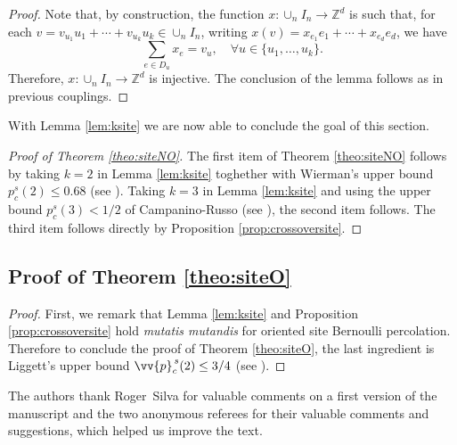 \documentclass{aptpub}
\newcommand{\Z}{\mathbb{Z}}
\begin{document}
\begin{proof}
Note  that, by construction, the function $x: \cup_n I_n \longrightarrow \Z^d$ is such that, for each $v = v_{u_1}u_1+ \cdots + v_{u_k}u_k \in \cup_n I_n$, writing $x(v) = x_{e_1} e_1 + \cdots + x_{e_d} e_d$, we have
\begin{equation*}
    \sum_{e \in D_u} x_e = v_u, \quad \forall u \in \{u_1, \dots, u_k\}.
\end{equation*}
Therefore, $x: \cup_n I_n \longrightarrow \Z^d$ is injective. The conclusion of the lemma follows as in previous couplings. %
\end{proof}

With Lemma \ref{lem:ksite} we are now able to conclude the goal of this section.

\begin{proof}[Proof of Theorem \ref{theo:siteNO}]
The first item of Theorem \ref{theo:siteNO} follows by taking $k=2$ in Lemma \ref{lem:ksite} toghether with Wierman's upper bound $p_c^s(2)\leq 0.68$ (see \cite{W2}). Taking $k=3$ in Lemma \ref{lem:ksite} and using the upper bound $p_c^s(3) < 1/2$ of Campanino-Russo (see \cite{CR}), the second item follows. The third item follows directly by Proposition \ref{prop:crossoversite}.
\end{proof}



\subsection{Proof of Theorem \ref{theo:siteO}}
\begin{proof}
First, we remark that Lemma \ref{lem:ksite} and Proposition \ref{prop:crossoversite} hold {\it mutatis mutandis} for oriented site Bernoulli percolation. Therefore to conclude the proof of Theorem \ref{theo:siteO}, the last ingredient is  Liggett's upper bound $\vv{p}^{\,s}_c(2) \leq 3/4$ (see \cite{L}).
\end{proof}


















\acks The authors thank Roger~Silva for valuable comments on a first version of the manuscript and the two anonymous referees for their valuable comments and suggestions, which helped us improve the text.
\end{document}
